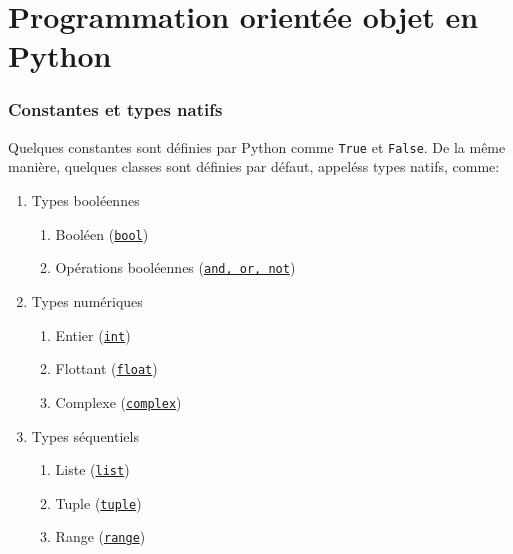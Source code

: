 \documentclass[a4paper, 10pt]{article}
\newcommand{\code}[1]{{\small\texttt{#1}}}
\begin{document}
\newpage
\part{Programmation orientée objet en Python}

\section{Constantes et types natifs}
 Quelques constantes sont définies par Python comme \code{True} et \code{False}. De la même manière, quelques classes sont définies par défaut, appeléss types natifs, comme:

\begin{enumerate}
		\item Types booléennes
		\begin{enumerate}
			\item Booléen (\href{https://docs.python.org/fr/3/library/functions.html?highlight=bool#bool}{\code{bool}})
			\item Opérations booléennes (\href{https://docs.python.org/fr/3/library/stdtypes.html#boolean-operations-and-or-not}{\code{and, or, not}})
		\end{enumerate}
        \item Types numériques
        \begin{enumerate}
              \item Entier (\href{https://docs.python.org/fr/3/library/stdtypes.html#typesnumeric}{\code{int}})
              \item Flottant (\href{https://docs.python.org/fr/3/library/stdtypes.html#typesnumeric}{\code{float}})
              \item Complexe (\href{https://docs.python.org/fr/3/library/stdtypes.html#typesnumeric}{\code{complex}})
      \end{enumerate}
     \item Types séquentiels
	\begin{enumerate}
       \item Liste (\href{https://docs.python.org/fr/3/library/stdtypes.html#sequence-types-list-tuple-range}{\code{list}})
		\item Tuple (\href{https://docs.python.org/fr/3/library/stdtypes.html#sequence-types-list-tuple-range}{\code{tuple}})
		\item Range (\href{https://docs.python.org/fr/3/library/stdtypes.html#sequence-types-list-tuple-range}{\code{range}})
	\end{enumerate}

\end{enumerate}
\end{document}
